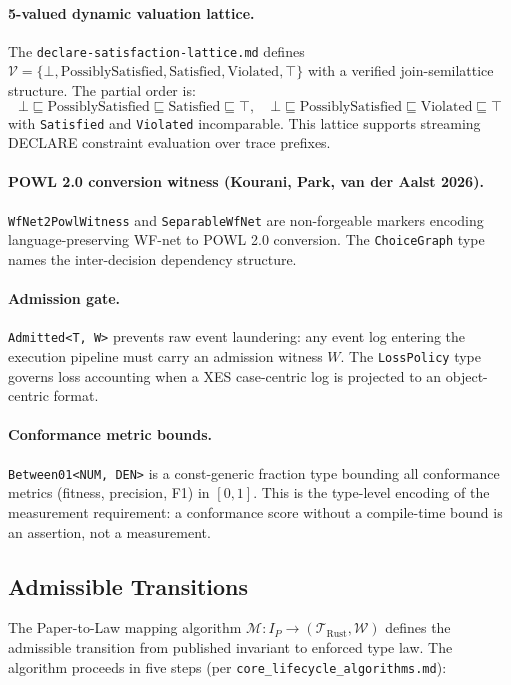 \paragraph{5-valued dynamic valuation lattice.}
The \texttt{declare-satisfaction-lattice.md} defines $\mathcal{V} = \{\bot,
\text{PossiblySatisfied}, \text{Satisfied}, \text{Violated}, \top\}$ with a
verified join-semilattice structure. The partial order is:
\[
\bot \sqsubseteq \text{PossiblySatisfied} \sqsubseteq \text{Satisfied}
\sqsubseteq \top, \quad
\bot \sqsubseteq \text{PossiblySatisfied} \sqsubseteq \text{Violated}
\sqsubseteq \top
\]
with \texttt{Satisfied} and \texttt{Violated} incomparable. This lattice
supports streaming DECLARE constraint evaluation over trace prefixes.

\paragraph{POWL 2.0 conversion witness (Kourani, Park, van der Aalst 2026).}
\texttt{WfNet2PowlWitness} and \texttt{SeparableWfNet} are non-forgeable
markers encoding language-preserving WF-net to POWL 2.0 conversion.
The \texttt{ChoiceGraph} type names the inter-decision dependency structure.

\paragraph{Admission gate.}
\texttt{Admitted<T, W>} prevents raw event laundering: any event log entering
the execution pipeline must carry an admission witness $W$. The
\texttt{LossPolicy} type governs loss accounting when a XES case-centric log
is projected to an object-centric format.

\paragraph{Conformance metric bounds.}
\texttt{Between01<NUM, DEN>} is a const-generic fraction type bounding all
conformance metrics (fitness, precision, F1) in $[0,1]$. This is the type-level
encoding of the measurement requirement: a conformance score without a
compile-time bound is an assertion, not a measurement.

\subsection{Admissible Transitions}
\label{sec:sources-papers-arch-transitions}

The Paper-to-Law mapping algorithm $\mathcal{M}: I_P \to
(\mathcal{T}_{\text{Rust}}, \mathcal{W})$ defines the admissible transition
from published invariant to enforced type law. The algorithm proceeds in five
steps (per \texttt{core\_lifecycle\_algorithms.md}):

